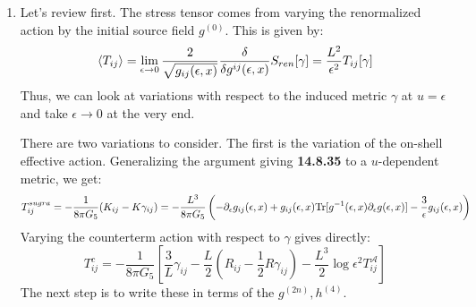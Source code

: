 \documentclass[11pt, class=article, crop=false]{standalone}
\begin{document}
\begin{enumerate}
	All together we get
	\[
	\begin{aligned}
		&-\frac{L^3}{16 \pi G_5} \int d^4 x \sqrt{g^{(0)}} \left[-\frac{6}{\epsilon^4} - \log \epsilon^2 \, A_4\right]\\
		& = \frac{L^3}{16 \pi G_5} \int d^4 x \sqrt{\gamma} \left[6 + \frac{6}{2} \frac{\epsilon^2}{L^2} \Tr g^{(2)}  + \Tr[ g^{(2)}]^2  + \log \epsilon^2 \, A_4 + \dots \right]\\
		&=  \frac{1}{16 \pi G_5} \int d^4 x \sqrt{\gamma} \left[\frac{6}{L} - \frac{L}{2} R[\gamma] - \frac{L^3}{8} \log \epsilon^2 \left(R_{ij}[\gamma] R^{ij}[\gamma] - \frac13 R[\gamma]^2 \right) \right]
	\end{aligned}
	\]
	Where the $\dots$ denotes ``up to finite terms''. \textbf{I think Kiritsis has a mistake and it should be $-\frac{L}{2} R$ not $+$. 0002230 confirms this.}

	\item Let's review first. The stress tensor comes from varying the renormalized action by the initial source field $g^{(0)}$. This is given by:
	\[
		\braket{T_{ij}} = \lim_{\epsilon \to 0} \frac{2}{\sqrt {g_{ij}(\epsilon, x)}} \frac{\delta}{\delta g^{ij}(\epsilon, x)} S_{ren}[\gamma] = \frac{L^2}{\epsilon^2} T_{ij}[\gamma]
	\]
	Thus, we can look at variations with respect to the induced metric $\gamma$ at $u = \epsilon$ and take $\epsilon \to 0$ at the very end. 
	
	There are two variations to consider. The first is the variation of the on-shell effective action. Generalizing the argument giving \textbf{14.8.35} to a $u$-dependent metric, we get:
	\[
		T^{sugra}_{ij} = -\frac{1}{8 \pi G_5} (K_{ij} - K \gamma_{ij}) = -\frac{L^3}{8 \pi G_5} \left(-\partial_\epsilon g_{ij}(\epsilon, x) + g_{ij}(\epsilon, x) \mathrm{Tr}[g^{-1}(\epsilon, x) \partial_\epsilon g(\epsilon, x)] - \frac{3}{\epsilon} g_{ij}(\epsilon, x) \right)
	\]
	Varying the counterterm action with respect to $\gamma$ gives directly:
	\[
		T^{c}_{ij} = - \frac{1}{8 \pi G_5} \left[\frac{3}{L} \gamma_{ij} - \frac{L}{2} \left(R_{ij} - \frac12 R \gamma_{ij} \right) - \frac{L^3}{2} \log{\epsilon^2} T^{\mathcal A}_{ij} \right]
	\]
	The next step is to write these in terms of the $g^{(2n)}, h^{(4)}$.
	

\end{enumerate}
\end{document}
